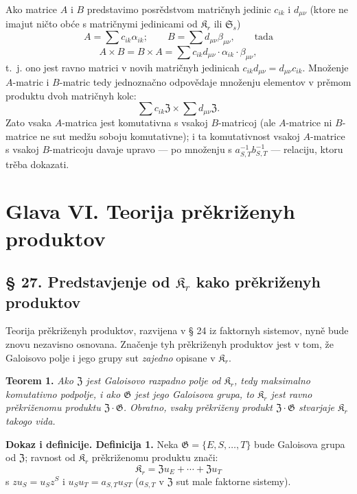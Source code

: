 \documentclass[11pt]{article}
\begin{document}
Ako matrice \(A\) i \(B\) predstavimo posrědstvom matričnyh jedinic \(c_{ik}\) i \(d_{\mu\nu}\) (ktore ne imajut ničto obće s matričnymi jedinicami od \(\mathfrak K_r\) ili \(\mathfrak S_s\))
\[
A=\sum c_{ik}\alpha_{ik};\qquad
B=\sum d_{\mu\nu}\beta_{\mu\nu},\qquad\text{tada}
\]
\[
A\times B=B\times A
=\sum c_{ik}d_{\mu\nu}\cdot\alpha_{ik}\cdot\beta_{\mu\nu},
\]
t.~j. ono jest ravno matrici v novih matričnyh jedinicah
\(c_{ik}d_{\mu\nu}=d_{\mu\nu}c_{ik}\). Množenje \(A\)-matric i \(B\)-matric tedy jednoznačno odpovědaje množenju elementov v prěmom produktu dvoh matričnyh kolc:
\[
\sum c_{ik}\mathfrak Z\times\sum d_{\mu\nu}\mathfrak Z.
\]
Zato vsaka \(A\)-matrica jest komutativna s vsakoj \(B\)-matricoj (ale \(A\)-matrice ni \(B\)-matrice ne sut medžu soboju komutativne); i ta komutativnost vsakoj \(A\)-matrice s vsakoj \(B\)-matricoju davaje upravo --- po množenju s \(a_{S,T}^{-1}b_{S,T}^{-1}\) --- relaciju, ktoru trěba dokazati.

\section*{Glava VI. Teorija prěkriženyh produktov}\label{kapitel-vi.-theorie-der-verschraenkten-produkte}

\subsection*{§ 27. Predstavjenje od \(\mathfrak K_r\) kako prěkriženyh produktov}

Teorija prěkriženyh produktov, razvijena v § 24 iz faktornyh sistemov, nyně bude znovu nezavisno osnovana. Značenje tyh prěkriženyh produktov jest v tom, že Galoisovo polje i jego grupy sut \emph{zajedno} opisane v \(\mathfrak K_r\).

\noindent\textbf{Teorem 1.} \emph{Ako \(\mathfrak Z\) jest Galoisovo razpadno polje od \(\mathfrak K_r\), tedy maksimalno komutativno podpolje, i ako \(\mathfrak G\) jest jego Galoisova grupa, to \(\mathfrak K_r\) jest ravno prěkriženomu produktu \(\mathfrak Z\cdot\mathfrak G\). Obratno, vsaky prěkriženy produkt \(\mathfrak Z\cdot\mathfrak G\) stvarjaje \(\mathfrak K_r\) takogo vida.}

\noindent\textbf{Dokaz i definicije. Definicija 1.} Neka \(\mathfrak G=\{E,S,\ldots,T\}\) bude Galoisova grupa od \(\mathfrak Z\); ravnost od \(\mathfrak K_r\) prěkriženomu produktu znači:
\[
\mathfrak K_r=\mathfrak Zu_E+\cdots+\mathfrak Zu_T
\]
s \(zu_S=u_Sz^S\) i \(u_Su_T=a_{S,T}u_{ST}\) (\(a_{S,T}\) v \(\mathfrak Z\) sut male faktorne sistemy).
\end{document}
